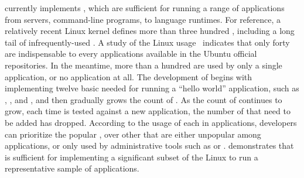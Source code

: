 

\Thelibos{} currently implements \graphenesyscallnum{} \linuxapis{},
which are sufficient for running a range of applications from servers, command-line programs, to language runtimes.
For reference,
a relatively recent Linux kernel defines more than three hundred \linuxapis{}, including a long tail of infrequently-used \linuxapis{}.
A study of the Linux \linuxapi{} usage~\cite{tsai16apistudy}
indicates that only forty \linuxapis{} are indispensable to every applications available in the Ubuntu official repositories.
In the meantime, more than a hundred \linuxapis{} are used by only a single application,
or no application at all.
The development of \thelibos{} begins with
implementing twelve basic \linuxapis{} needed for running a ``hello world'' application,
such as , , and ,
and then gradually grows the count of \linuxapis{}.
As the count of \linuxapis{} continues to grow,
each time \thelibos{} is tested against a new application, the number of \linuxapis{} that need to be added
has dropped.
According to the usage of each \linuxapi{} in applications,
developers can prioritize the popular \linuxapis{}, over other \linuxapis{} that are either unpopular among applications, or only used by administrative tools such as  or .
\thelibos{} demonstrates that
\thehostabi{} is sufficient for implementing
a significant subset of the Linux \linuxapis{} to run
a representative sample of applications.


